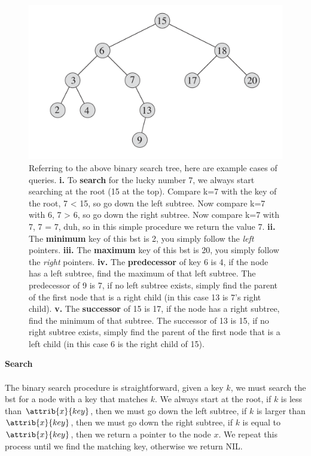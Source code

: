 \documentclass[12pt]{article}
\begin{document}
\begin{figure}[!ht]
\includegraphics[scale=0.3]{bst1}
\caption{
    Referring to the above binary search tree, here are example cases of queries.
    \textbf{i.} To \textbf{search} for the lucky number 7, we always start searching at the root (15 at the top). Compare k=7 with the key of the root, 7 < 15, so go down the left subtree. Now compare k=7 with 6, 7 > 6, so go down the right subtree. Now compare k=7 with 7, 7 = 7, duh, so in this simple procedure we return the value 7.
    \textbf{ii.} The \textbf{minimum} key of this bst is 2, you simply follow the \textit{left} pointers.
    \textbf{iii.} The \textbf{maximum} key of this bst is 20, you simply follow the \textit{right} pointers.
    \textbf{iv.} The \textbf{predecessor} of key 6 is 4, if the node has a left subtree, find the maximum of that left subtree. The predecessor of 9 is 7, if no left subtree exists, simply find the parent of the first node that is a right child (in this case 13 is 7's right child).
    \textbf{v.} The \textbf{successor} of 15 is 17, if the node has a right subtree, find the minimum of that subtree. The successor of 13 is 15, if no right subtree exists, simply find the parent of the first node that is a left child (in this case 6 is the right child of 15).
}
\label{fig:bst_example1}
\end{figure}
\newpage

\textbf{Search}
\\ \\
The binary search procedure is straightforward, given a key $k$, we must search the bst for a node with a key that matches $k$. We always start at the root, if $k$ is less than $\attrib{x}{key}$, then we must go down the left subtree, if $k$ is larger than $\attrib{x}{key}$, then we must go down the right subtree, if $k$ is equal to $\attrib{x}{key}$, then we return a pointer to the node $x$. We repeat this process until we find the matching key, otherwise we return NIL.
\end{document}
